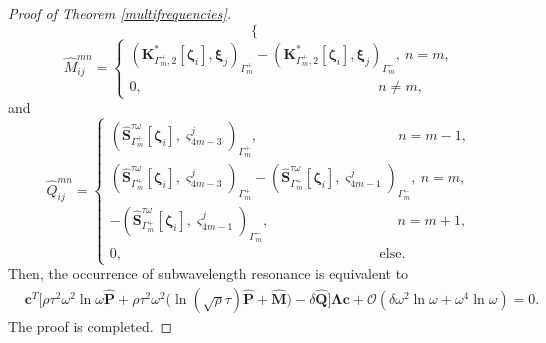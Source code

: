 \documentclass[10pt,reqno,oneside]{amsart}%
\theoremstyle{definition}
\newtheorem{rem}{Remark}[section]
\theoremstyle{remark}
\numberwithin{equation}{section}
\numberwithin{equation}{section}
\begin{document}
\begin{proof}[Proof of Theorem \ref{multifrequencies}]
\begin{equation}
\begin{cases}
		\end{cases}
	\end{equation}
	\begin{equation}\label{matriceshat4}
		\hat{M}_{ij}^{mn}=
		\begin{cases}
			\left(\mathbf{K}_{\Gamma_{m}^{+},2}^{*}[\boldsymbol{\zeta}_i],\boldsymbol{\xi}_{j}\right)_{\Gamma_{m}^{+}}-
			\left(\mathbf{K}_{\Gamma_{m}^{+},2}^{*}[\boldsymbol{\zeta}_i],\boldsymbol{\xi}_{j}\right)_{\Gamma_{m}^{-}},\ n=m,\\
			0,\quad\quad \quad\quad \quad\quad \quad\quad \quad\quad \quad\quad \quad\quad \quad\quad \ \ \ \, n\neq m ,\nonumber
		\end{cases}
	\end{equation}
	and
	\begin{equation}\label{matriceshat5}
		\hat{Q}_{ij}^{mn}=
		\begin{cases}
			\left(\hat{\mathbf{S}}_{\Gamma_{m}^{+}}^{\tau\omega}[\boldsymbol{\zeta}_i],\varsigma_{4m-3}^{j}\right)_{\Gamma_{m}^{+}},\quad \quad\quad \quad \quad\quad\quad \quad\quad\quad  n=m-1,\\
			\left(\hat{\mathbf{S}}_{\Gamma_{m}^{+}}^{\tau\omega}[\boldsymbol{\zeta}_i],\varsigma_{4m-3}^{j}\right)_{\Gamma_{m}^{+}}-
			\left(\hat{\mathbf{S}}_{\Gamma_{m}^{+}}^{\tau\omega}[\boldsymbol{\zeta}_i],\varsigma_{4m-1}^{j}\right)_{\Gamma_{m}^{-}},\ n=m,\\
			-\left(\hat{\mathbf{S}}_{\Gamma_{m}^{+}}^{\tau\omega}[\boldsymbol{\zeta}_i],\varsigma_{4m-1}^{j}\right)_{\Gamma_{m}^{-}}, \quad\quad \quad \quad\quad\quad \quad\quad\quad\, n=m+1,\\
			0,\quad\quad\,\quad \quad\quad \quad \quad\quad\quad \quad\quad\quad \quad\quad \quad \quad\quad\quad \,\text{else}.\nonumber
		\end{cases}
	\end{equation}
	Then, the occurrence of subwavelength resonance is equivalent to
	\begin{align}
		&\mathbf{c}^{T}\Big[  \rho\tau^2\omega^2\ln\omega\hat{\mathbf{P}}+\rho\tau^2\omega^2\Big(\ln{(\sqrt{\rho}\tau)}\hat{\mathbf{P}}
		+\hat{\mathbf{M}}\Big)-\delta\hat{\mathbf{Q}}\Big] \mathbf{\Lambda}\mathbf{c}+\mathcal{O}(\delta\omega^2\ln{\omega}+\omega^4\ln{\omega})=0.\nonumber
	\end{align}
	The proof is completed.
\end{proof}
\end{document}
